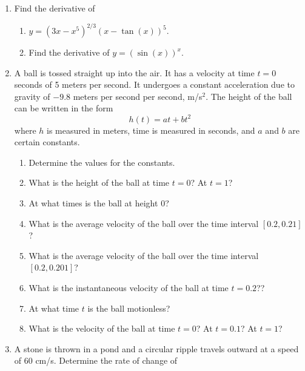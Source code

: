 \documentclass[11pt,fleqn]{article}
\begin{document}
\setlength{\parindent}{0cm}
\renewcommand{\headrulewidth}{0pt}
\newcommand{\blank}[1]{\rule{#1}{0.75pt}}
\renewcommand{\d}{\displaystyle}
\vspace*{-0.7in}
\begin{center}
 {\large{ }}
\end{center}
\begin{enumerate} 	
\item Find the derivative of
	\begin{enumerate}
	\item $y=(3x-x^5)^{2/3}(x-\tan(x))^5.$\\
	\vfill
	\item Find the derivative of $y=(\sin (x))^x.$
	\vfill
	\end{enumerate}
\newpage
\begin{center}
 {\large{ }}
\end{center}
\item A ball is tossed straight up into the air. It has a velocity
at time $t=0$ seconds of 5 meters per second.  It undergoes a constant
acceleration due to gravity of $-9.8$ meters per second per second,
m/s$^2$.   The height of the ball can be written in the form
\[
h(t) = at + b t^2
\]
where $h$ is measured in meters, time is measured in seconds, and $a$
and $b$ are certain constants.
\begin{enumerate}
\item Determine the values for the constants.
\vfill
\item What is the height of the ball at time $t=0$? At $t=1$?
\vfill
\item At what times is the ball at height $0$?
\vfill
\item What is the average velocity of the ball over the time interval
$[0.2,0.21]$?
\vfill
\item What is the average velocity of the ball over the time interval
$[0.2,0.201]$?
\vfill
\item What is the instantaneous velocity of the ball at time $t=0.2$??
\vfill
\item At what time $t$ is the ball motionless?
\vfill
\item What is the velocity of the ball at time $t=0$? At $t=0.1$? At $t=1$?
\vfill
\end{enumerate}
\newpage
\item A stone is thrown in a pond and a circular ripple travels
outward at a speed of 60 cm/s.  Determine the rate of change of

\end{enumerate}
\end{document}
